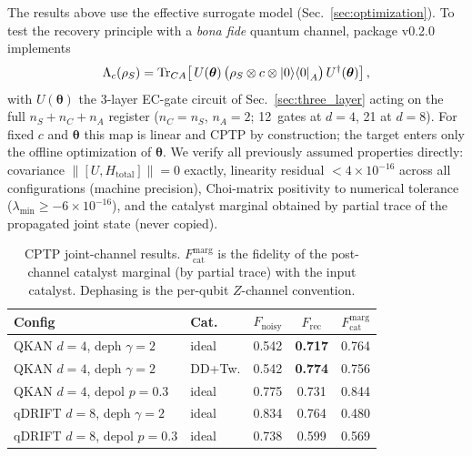 \documentclass[a4paper,twocolumn]{quantumarticle}
\newenvironment{ruledtabular}{}{}%
\providecommand{\colrule}{\hline}
\begin{document}
The results above use the effective surrogate model (Sec.~\ref{sec:optimization}).
To test the recovery principle with a \emph{bona fide} quantum channel, package v0.2.0 implements
\begin{equation}
\Lambda_c(\rho_S) = \mathrm{Tr}_{CA}\!\left[\,U(\boldsymbol{\theta})\,
\bigl(\rho_S \otimes c \otimes \ket{0}\!\bra{0}_A\bigr)\,
U^\dagger(\boldsymbol{\theta})\right],
\label{eq:joint_channel}
\end{equation}
with $U(\boldsymbol{\theta})$ the 3-layer EC-gate circuit of Sec.~\ref{sec:three_layer} acting on the full $n_S + n_C + n_A$ register ($n_C = n_S$, $n_A = 2$; 12~gates at $d = 4$, 21 at $d = 8$).
For fixed $c$ and $\boldsymbol{\theta}$ this map is linear and CPTP by construction; the target enters only the offline optimization of $\boldsymbol{\theta}$.
We verify all previously assumed properties directly: covariance $\|[U, H_\mathrm{total}]\| = 0$ exactly, linearity residual $< 4 \times 10^{-16}$ across all configurations (machine precision), Choi-matrix positivity to numerical tolerance ($\lambda_\mathrm{min} \geq -6 \times 10^{-16}$), and the catalyst marginal obtained by partial trace of the propagated joint state (never copied).

\begin{table}[!tbp]
\caption{CPTP joint-channel results. $F_\mathrm{cat}^\mathrm{marg}$ is the fidelity of the post-channel catalyst marginal (by partial trace) with the input catalyst. Dephasing is the per-qubit $Z$-channel convention.}
\label{tab:joint}
\centering\scriptsize
\setlength{\tabcolsep}{2.5pt}
\begin{ruledtabular}
\begin{tabular}{llccc}
Config & Cat. & $F_\mathrm{noisy}$ & $F_\mathrm{rec}$ & $F_\mathrm{cat}^\mathrm{marg}$ \\
\colrule
QKAN $d{=}4$, deph $\gamma{=}2$ & ideal & 0.542 & \textbf{0.717} & 0.764 \\
QKAN $d{=}4$, deph $\gamma{=}2$ & DD+Tw. & 0.542 & \textbf{0.774} & 0.756 \\
QKAN $d{=}4$, depol $p{=}0.3$ & ideal & 0.775 & 0.731 & 0.844 \\
qDRIFT $d{=}8$, deph $\gamma{=}2$ & ideal & 0.834 & 0.764 & 0.480 \\
qDRIFT $d{=}8$, depol $p{=}0.3$ & ideal & 0.738 & 0.599 & 0.569 \\
\end{tabular}
\end{ruledtabular}
\end{table}
\end{document}
